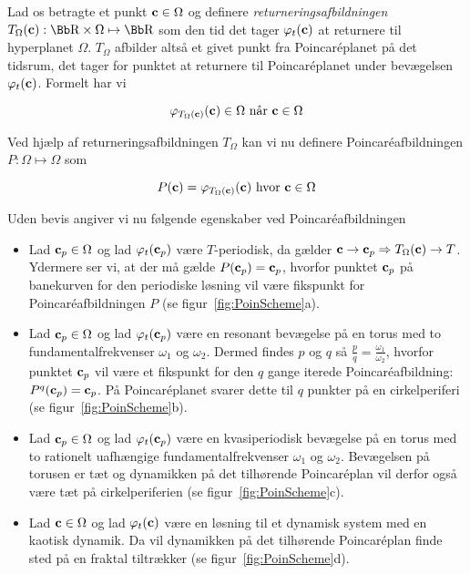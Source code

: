 Lad os betragte et punkt ${\bf c} \in \Omega$ og definere
{\em returneringsafbild\-ningen} $T_\Omega({\bf c}):
\R\times\Omega \mapsto \R$ som den tid det tager
$\varphi_t({\bf c})$ at returnere til hyperplanet $\Omega$.
$T_\Omega$ afbild\-er alts{\aa} et givet punkt fra
Poincar\'{e}planet p{\aa} det tidsrum, det tager for
punktet at returnere til Poincar\'{e}planet under
bev{\ae}gelsen $\varphi_t({\bf c})$. Formelt har vi

\begin{equation}
 \varphi_{T_\Omega({\bf c})}({\bf c}) \in \Omega
 \mbox{\ n{\aa}r\ }
 {\bf c} \in \Omega
\end{equation}

Ved hj{\ae}lp af returneringsafbild\-ningen $T_\Omega$ kan vi
nu definere Poincar\'{e}\-afbild\-\-ningen $P: \Omega \mapsto
\Omega$ som

\begin{equation}
 P({\bf c}) = \varphi_{T_\Omega({\bf c})}({\bf c})
 \mbox{\ hvor\ }
 {\bf c} \in \Omega
\end{equation}

Uden bevis angiver vi nu f{\o}lgende egenskaber ved
Poincar\'{e}\-afbild\-\-ningen

\begin{itemize}
  \item Lad ${\bf c}_p \in \Omega$ og lad $\varphi_t({\bf
  c}_p)$ v{\ae}re $T$-periodisk, da g{\ae}lder ${\bf c}
  \rightarrow {\bf c}_p \Rightarrow T_\Omega({\bf c})
  \rightarrow T$. Ydermere ser vi, at der m{\aa} g{\ae}lde
  $P({\bf c}_p)={\bf c}_p$, hvorfor punktet ${\bf c}_p$
  p{\aa} banekurven for den periodiske l{\o}sning vil
  v{\ae}re fikspunkt for Poincar\'{e}afbild\-ningen $P$ (se
  figur~\ref{fig:PoinScheme}a).
  \item Lad ${\bf c}_p \in \Omega$ og lad $\varphi_t({\bf
  c}_p)$ v{\ae}re en resonant bev{\ae}gelse p{\aa} en torus
  med to fundamentalfrekvenser $\omega_1$ og $\omega_2$.
  Dermed findes $p$ og $q$ s{\aa} $\frac{p}{q} =
  \frac{\omega_1}{\omega_2}$, hvorfor punktet ${\bf c}_p$
  vil v{\ae}re et fikspunkt for den $q$ gange iterede
  Poincar\'{e}afbild\-ning: $P^q({\bf c}_p)={\bf c}_p$.
  P{\aa} Poincar\'{e}planet svarer dette til $q$ punkter
  p{\aa} en cirkelperiferi (se
  figur~\ref{fig:PoinScheme}b).
  \item Lad ${\bf c}_p \in \Omega$ og lad $\varphi_t({\bf
  c}_p)$ v{\ae}re en kvasiperiodisk bev{\ae}gelse p{\aa} en
  torus med to rationelt uafh{\ae}ngige
  fundamentalfrekvenser $\omega_1$ og $\omega_2$.
  Bev{\ae}g\-el\-sen p{\aa} torusen er t{\ae}t og
  dynamikken p{\aa} det tilh{\o}rende Poincar\'{e}plan vil
  derfor ogs{\aa} v{\ae}re t{\ae}t p{\aa} cirkelperiferien
  (se figur~\ref{fig:PoinScheme}c).
  \item Lad ${\bf c} \in \Omega$ og lad $\varphi_t({\bf
  c})$ v{\ae}re en l{\o}sning til et dynamisk system med en
  kaotisk dynamik. Da vil dynamikken p{\aa} det
  tilh{\o}rende Poincar\'{e}plan finde sted p{\aa} en
  fraktal tiltr{\ae}kker (se figur~\ref{fig:PoinScheme}d).
\end{itemize}

